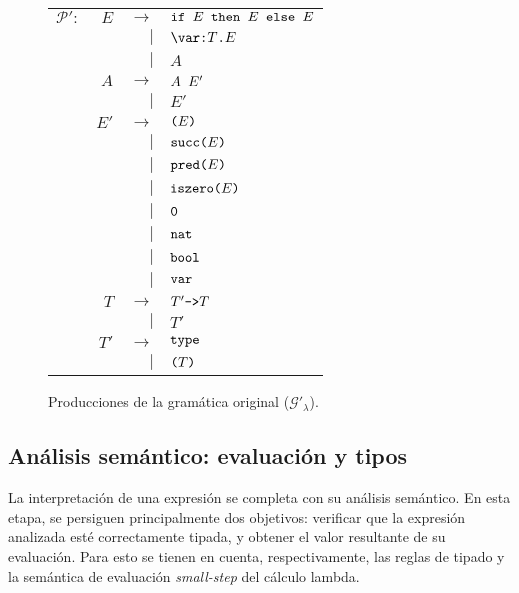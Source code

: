 \documentclass[11pt]{article}
\newcommand\produces{$\rightarrow$ \qquad}
\newcommand\alsoproduces{$\vert$}
\begin{document}
\begin{figure}[H] \centering
\begin{tabular}{lrrl}
$\mathcal{P}':$
& $E$  & \produces     & $\verb|if | E \verb| then | E \verb| else | E$ \\
&      & \alsoproduces & $\verb|\var:| T \verb|.| E$ \\
&      & \alsoproduces & $A$ \\
& $A$  & \produces     & $A \verb| | E'$ \\
&      & \alsoproduces & $E'$ \\
& $E'$ & \produces     & $\verb|(| E \verb|)|$ \\
&      & \alsoproduces & $\verb|succ(| E \verb|)|$ \\
&      & \alsoproduces & $\verb|pred(| E \verb|)|$ \\
&      & \alsoproduces & $\verb|iszero(| E \verb|)|$ \\
&      & \alsoproduces & $\verb|0|$ \\
&      & \alsoproduces & $\verb|nat|$ \\
&      & \alsoproduces & $\verb|bool|$ \\
&      & \alsoproduces & $\verb|var|$ \\
& $T$  & \produces     & $T' \verb|->| T$ \\
&      & \alsoproduces & $T'$ \\
& $T'$ & \produces     & $\verb|type|$ \\
&      & \alsoproduces & $\verb|(| T \verb|)|$ \\
\end{tabular}
\caption{Producciones de la gramática original ($\mathcal{G}'_{\lambda}$).}
\label{fig:gramatica-original}
\end{figure}


\subsection{Análisis semántico: evaluación y tipos}

La interpretación de una expresión se completa con su análisis semántico.
En esta etapa, se persiguen principalmente dos objetivos: verificar que la
expresión analizada esté correctamente tipada, y obtener el valor resultante
de su evaluación. Para esto se tienen en cuenta, respectivamente, las reglas
de tipado y la semántica de evaluación \emph{small-step} del cálculo lambda.
\end{document}
